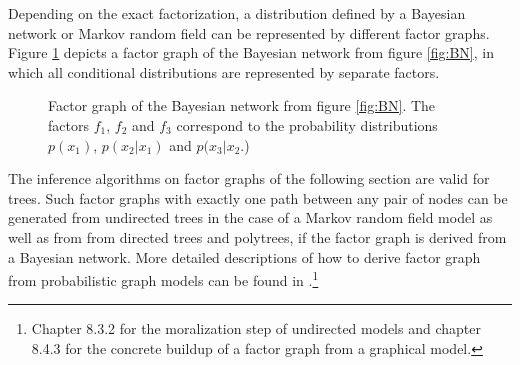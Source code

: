 \documentclass{sigkdd}
\begin{document}
Depending on the exact factorization, a distribution defined by a Bayesian network or Markov random field can be represented by different factor graphs. Figure \ref{fig:FG} depicts a factor graph of the Bayesian network from figure \ref{fig:BN}, in which all conditional distributions are represented by separate factors.

\begin{figure}[h]
	\centering
	\caption{Factor graph of the Bayesian network from figure \ref{fig:BN}. The factors $f_1$, $f_2$ and $f_3$ correspond to the probability distributions $p(x_1)$, $p(x_2|x_1)$ and $p(x_3|x_2$.)}\label{fig:FG}
\end{figure}

The inference algorithms on factor graphs of the following section are valid for trees. Such factor graphs with exactly one path between any pair of nodes can be generated from undirected trees in the case of a Markov random field model as well as from from directed trees and polytrees, if the factor graph is derived from a Bayesian network. More detailed descriptions of how to derive factor graph from probabilistic graph models can be found in \cite{bishop2006prml}.\footnote{Chapter 8.3.2 for the moralization step of undirected models and chapter 8.4.3 for the concrete buildup of a factor graph from a graphical model.}
\end{document}
